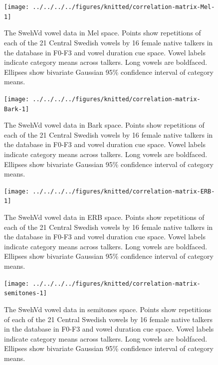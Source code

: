 \documentclass[utf8]{frontiers_suppmat} %
\begin{document}
\begin{figure}[H]
\texttt{[image: ../../../../figures/knitted/correlation-matrix-Mel-1]} \caption{The SwehVd vowel data in Mel space. Points show repetitions of each of the 21 Central Swedish vowels by 16 female native talkers in the database in F0-F3 and vowel duration cue space. Vowel labels indicate category means across talkers. Long vowels are boldfaced. Ellipses show bivariate Gaussian 95\% confidence interval of category means.}\label{fig:correlation-matrix-Mel}
\end{figure}



\begin{figure}[H]
\texttt{[image: ../../../../figures/knitted/correlation-matrix-Bark-1]} \caption{The SwehVd vowel data in Bark space. Points show repetitions of each of the 21 Central Swedish vowels by 16 female native talkers in the database in F0-F3 and vowel duration cue space. Vowel labels indicate category means across talkers. Long vowels are boldfaced. Ellipses show bivariate Gaussian 95\% confidence interval of category means.}\label{fig:correlation-matrix-Bark}
\end{figure}



\begin{figure}[H]
\texttt{[image: ../../../../figures/knitted/correlation-matrix-ERB-1]} \caption{The SwehVd vowel data in ERB space. Points show repetitions of each of the 21 Central Swedish vowels by 16 female native talkers in the database in F0-F3 and vowel duration cue space. Vowel labels indicate category means across talkers. Long vowels are boldfaced. Ellipses show bivariate Gaussian 95\% confidence interval of category means.}\label{fig:correlation-matrix-ERB}
\end{figure}



\begin{figure}[H]
\texttt{[image: ../../../../figures/knitted/correlation-matrix-semitones-1]} \caption{The SwehVd vowel data in semitones space. Points show repetitions of each of the 21 Central Swedish vowels by 16 female native talkers in the database in F0-F3 and vowel duration cue space. Vowel labels indicate category means across talkers. Long vowels are boldfaced. Ellipses show bivariate Gaussian 95\% confidence interval of category means.}\label{fig:correlation-matrix-semitones}
\end{figure}
\end{document}
